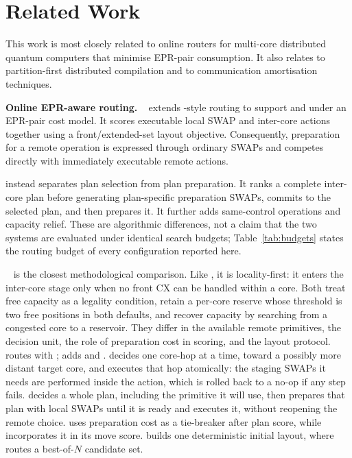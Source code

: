 \section{Related Work}
\label{sec:related}

This work is most closely related to online routers for multi-core
distributed quantum computers that minimise EPR-pair consumption. It also
relates to partition-first distributed compilation and to communication
amortisation techniques.

\textbf{Online EPR-aware routing.} \TeleSABRE{}~\cite{russo2025telesabre}
extends \SABRE{}-style routing to support \TeleData{} and \TeleGate{} under
an EPR-pair cost model. It scores executable local SWAP and inter-core
actions together using a front/extended-set layout objective. Consequently,
preparation for a remote operation is expressed through ordinary SWAPs and
competes directly with immediately executable remote actions.

\PORTER{} instead separates plan selection from plan preparation. It ranks a
complete inter-core plan before generating plan-specific preparation SWAPs,
commits to the selected plan, and then prepares it. It further adds
same-control \TeleGatePacket{} operations and capacity relief. These are
algorithmic differences, not a claim that the two systems are evaluated
under identical search budgets; Table~\ref{tab:budgets} states the routing
budget of every configuration reported here.

\dSABRE{}~\cite{lidsabre} is the closest methodological comparison. Like
\PORTER{}, it is locality-first: it enters the inter-core stage only when
no front CX can be handled within a core. Both treat free capacity as a
legality condition, retain a per-core reserve whose threshold is two free
positions in both defaults, and recover capacity by
searching from a congested core to a reservoir. They differ in the available
remote primitives, the decision unit, the role of preparation cost in
scoring, and the layout protocol. \dSABRE{} routes with \TeleData{}; \PORTER{}
adds \TeleGate{} and \TeleGatePacket{}. \dSABRE{} decides one core-hop at a time,
toward a possibly more distant target core, and executes that hop atomically:
the staging SWAPs it needs are performed inside the action, which is rolled
back to a no-op if any step fails. \PORTER{} decides a whole plan, including
the primitive it will use, then prepares that plan with local SWAPs until it
is ready and executes it, without reopening the remote choice. \PORTER{} uses
preparation cost as a tie-breaker after plan score, while \dSABRE{}
incorporates it in its move score. \PORTER{} builds one deterministic
initial layout, where \dSABRE{} routes a best-of-$N$ candidate set.

